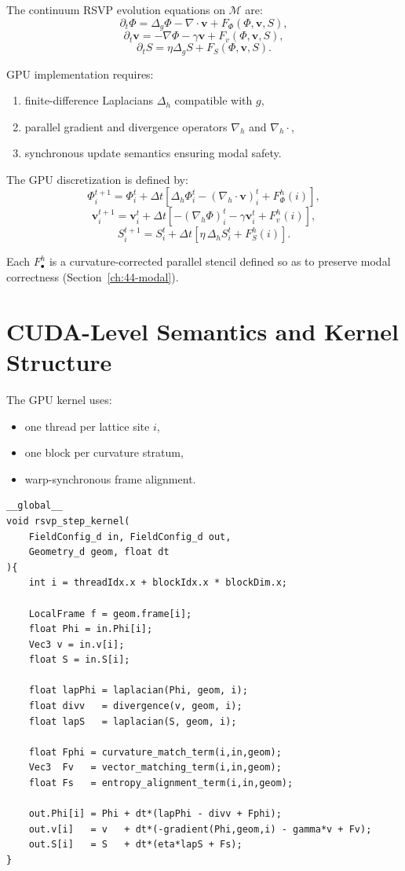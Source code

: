 The continuum RSVP evolution equations on $\mathcal{M}$ are:
\[
\partial_t \Phi = \Delta_g \Phi - \nabla\!\cdot \mathbf{v} + F_\Phi(\Phi,\mathbf{v},S),
\]
\[
\partial_t \mathbf{v} = -\nabla \Phi - \gamma \mathbf{v} + F_v(\Phi,\mathbf{v},S),
\]
\[
\partial_t S = \eta \Delta_g S + F_S(\Phi,\mathbf{v},S).
\]

GPU implementation requires:

\begin{enumerate}
\item finite-difference Laplacians $\Delta_h$ compatible with $g$,
\item parallel gradient and divergence operators $\nabla_h$ and $\nabla_h\!\cdot$,
\item synchronous update semantics ensuring modal safety.
\end{enumerate}

The GPU discretization is defined by:
\[
\Phi_i^{t+1} = \Phi_i^{t} + \Delta t\left[\Delta_h\Phi_i^{t} - (\nabla_h\!\cdot\mathbf{v})_i^{t} + F_\Phi^h(i)\right],
\]
\[
\mathbf{v}_i^{t+1} = \mathbf{v}_i^{t} + \Delta t\left[-(\nabla_h\Phi)_i^{t} - \gamma\mathbf{v}_i^{t} + F_v^h(i)\right],
\]
\[
S_i^{t+1} = S_i^{t} + \Delta t\left[\eta\,\Delta_h S_i^{t} + F_S^h(i)\right].
\]

Each $F_\bullet^h$ is a curvature-corrected parallel stencil defined so as to preserve modal correctness (Section~\ref{ch:44-modal}).

\section{CUDA-Level Semantics and Kernel Structure}

The GPU kernel uses:
\begin{itemize}
\item one thread per lattice site $i$,
\item one block per curvature stratum,
\item warp-synchronous frame alignment.
\end{itemize}

\begin{verbatim}
__global__
void rsvp_step_kernel(
    FieldConfig_d in, FieldConfig_d out,
    Geometry_d geom, float dt
){
    int i = threadIdx.x + blockIdx.x * blockDim.x;

    LocalFrame f = geom.frame[i];
    float Phi = in.Phi[i];
    Vec3 v = in.v[i];
    float S = in.S[i];

    float lapPhi = laplacian(Phi, geom, i);
    float divv   = divergence(v, geom, i);
    float lapS   = laplacian(S, geom, i);

    float Fphi = curvature_match_term(i,in,geom);
    Vec3  Fv   = vector_matching_term(i,in,geom);
    float Fs   = entropy_alignment_term(i,in,geom);

    out.Phi[i] = Phi + dt*(lapPhi - divv + Fphi);
    out.v[i]   = v   + dt*(-gradient(Phi,geom,i) - gamma*v + Fv);
    out.S[i]   = S   + dt*(eta*lapS + Fs);
}
\end{verbatim}

